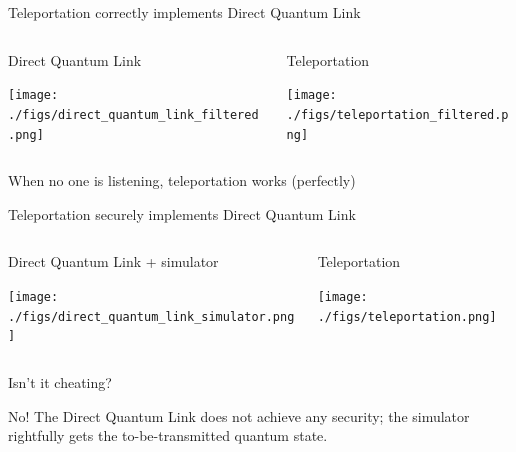 \documentclass[presentation]{beamer}
\begin{document}
\begin{frame}[label={sec:org888c50b}]{Teleportation correctly implements Direct Quantum Link}
\begin{columns}[t]
\begin{column}{.5\columnwidth}
\begin{block}{Direct Quantum Link}
\begin{center}
\texttt{[image: ./figs/direct\_quantum\_link\_filtered.png]}
\end{center}
\end{block}
\end{column}
\begin{column}{.5\columnwidth}
\begin{block}{Teleportation}
\begin{center}
\texttt{[image: ./figs/teleportation\_filtered.png]}
\end{center}
\end{block}
\end{column}
\end{columns}
\begin{block}{}
When no one is listening, teleportation works (perfectly)
\end{block}
\end{frame}

\begin{frame}[label={sec:org58dfed8}]{Teleportation securely implements Direct Quantum Link}
\begin{columns}[t]
\begin{column}{.5\columnwidth}
\begin{block}{Direct Quantum Link + simulator}
\begin{center}
\texttt{[image: ./figs/direct\_quantum\_link\_simulator.png]}
\end{center}
\end{block}
\end{column}
\begin{column}{.5\columnwidth}
\begin{block}{Teleportation}
\begin{center}
\texttt{[image: ./figs/teleportation.png]}
\end{center}
\end{block}
\end{column}
\end{columns}
\begin{block}{}
Isn't it cheating? 

No! The Direct Quantum Link does not achieve any security; the simulator rightfully  gets the to-be-transmitted quantum state. 
\end{block}
\end{frame}
\end{document}
